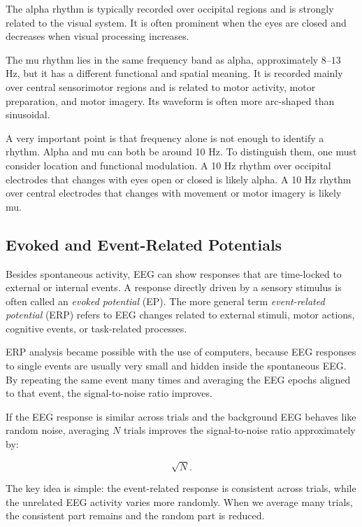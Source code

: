 The alpha rhythm is typically recorded over occipital regions and is strongly related to the visual system. It is often prominent when the eyes are closed and decreases when visual processing increases.

The mu rhythm lies in the same frequency band as alpha, approximately $8$--$13$ Hz, but it has a different functional and spatial meaning. It is recorded mainly over central sensorimotor regions and is related to motor activity, motor preparation, and motor imagery. Its waveform is often more arc-shaped than sinusoidal.

\begin{authornote}
A very important point is that frequency alone is not enough to identify a rhythm. Alpha and mu can both be around 10 Hz. To distinguish them, one must consider location and functional modulation. A 10 Hz rhythm over occipital electrodes that changes with eyes open or closed is likely alpha. A 10 Hz rhythm over central electrodes that changes with movement or motor imagery is likely mu.
\end{authornote}

\subsection{Evoked and Event-Related Potentials}

Besides spontaneous activity, EEG can show responses that are time-locked to external or internal events. A response directly driven by a sensory stimulus is often called an \textit{evoked potential} (EP). The more general term \textit{event-related potential} (ERP) refers to EEG changes related to external stimuli, motor actions, cognitive events, or task-related processes.

ERP analysis became possible with the use of computers, because EEG responses to single events are usually very small and hidden inside the spontaneous EEG. By repeating the same event many times and averaging the EEG epochs aligned to that event, the signal-to-noise ratio improves.

If the EEG response is similar across trials and the background EEG behaves like random noise, averaging $N$ trials improves the signal-to-noise ratio approximately by:

\[
\sqrt{N}.
\]

\begin{authornote}
The key idea is simple: the event-related response is consistent across trials, while the unrelated EEG activity varies more randomly. When we average many trials, the consistent part remains and the random part is reduced.
\end{authornote}

